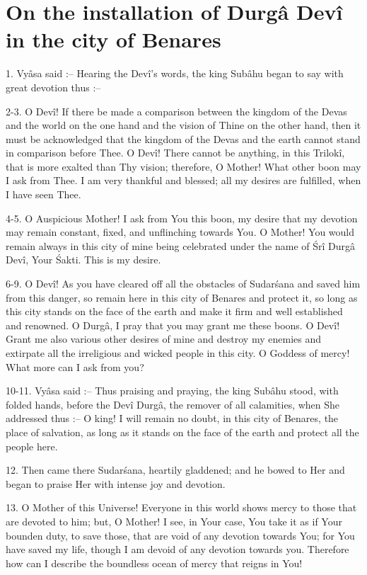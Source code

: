 ﻿\chapter{On the installation of Durg\^a Dev\^i in the city of Benares}

1. Vy\^asa said :-- Hearing the Dev\^i's words, the king Sub\^ahu began to say with great devotion thus :--

2-3. O Dev\^i! If there be made a comparison between the kingdom of the Devas and the world on the one hand and the vision of Thine on the other hand, then it must be acknowledged that the kingdom of the Devas and the earth cannot stand in comparison before Thee. O Dev\^i! There cannot be anything, in this Trilok\^i, that is more exalted than Thy vision; therefore, O Mother! What other boon may I ask from Thee. I am very thankful and blessed; all my desires are fulfilled, when I have seen Thee.

4-5. O Auspicious Mother! I ask from You this boon, my desire that my devotion may remain constant, fixed, and unflinching towards You. O Mother! You would remain always in this city of mine being celebrated under the name of \'Sr\^i Durg\^a Dev\^i, Your \'Sakti. This is my desire.

6-9. O Dev\^i! As you have cleared off all the obstacles of Sudar\'sana and saved him from this danger, so remain here in this city of Benares and protect it, so long as this city stands on the face of the earth and make it firm and well established and renowned. O Durg\^a, I pray that you may grant me these boons. O Dev\^i! Grant me also various other desires of mine and destroy my enemies and extirpate all the irreligious and wicked people in this city. O Goddess of mercy! What more can I ask from you?

10-11. Vy\^asa said :-- Thus praising and praying, the king Sub\^ahu stood, with folded hands, before the Dev\^i Durg\^a, the remover of all calamities, when She addressed thus :-- O king! I will remain no doubt, in this city of Benares, the place of salvation, as long as it stands on the face of the earth and protect all the people here.

12. Then came there Sudar\'sana, heartily gladdened; and he bowed to Her and began to praise Her with intense joy and devotion.

13. O Mother of this Universe! Everyone in this world shows mercy to those that are devoted to him; but, O Mother! I see, in Your case, You take it as if Your bounden duty, to save those, that are void of any devotion towards You; for You have saved my life, though I am devoid of any devotion towards you. Therefore how can I describe the boundless ocean of mercy that reigns in You!

